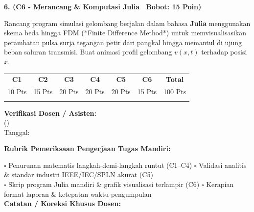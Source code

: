 \documentclass[10pt,a4paper]{article}
\begin{document}
\vspace{3.5mm}

\noindent\textbf{6. (C6 - Merancang \& Komputasi Julia \textbar\ Bobot: 15 Poin)}\par\vspace{0.8mm}
{\footnotesize Rancang program simulasi gelombang berjalan dalam bahasa \textbf{Julia} menggunakan skema beda hingga FDM (*Finite Difference Method*) untuk memvisualisasikan perambatan pulsa surja tegangan petir dari pangkal hingga memantul di ujung beban saluran transmisi. Buat animasi profil gelombang $v(x,t)$ terhadap posisi $x$.}\par

\vfill

\noindent\begin{minipage}[b]{0.62\textwidth}%
  \centering
  \scriptsize
  \begin{tabular}{|c|c|c|c|c|c|c|}
    \hline
    \rowcolor{unibblue}
    \textbf{\color{white}C1} & \textbf{\color{white}C2} & \textbf{\color{white}C3} & \textbf{\color{white}C4} & \textbf{\color{white}C5} & \textbf{\color{white}C6} & \textbf{\color{white}Total} \\
    \rowcolor{unibblue!10}
    10 Pts & 15 Pts & 20 Pts & 20 Pts & 20 Pts & 15 Pts & 100 Pts \\
    \hline
    & & & & & & \\[3mm]
    \hline
  \end{tabular}%
\end{minipage}%
\hfill%
\begin{minipage}[b]{0.35\textwidth}%
  \centering
  \scriptsize
  \textbf{Verifikasi Dosen / Asisten:}\\[6mm]
  (\dotfill)\\[1mm]
  \tiny Tanggal: \dotfill
\end{minipage}\par

\vspace{2mm}
\begin{tcolorbox}[colback=white,colframe=unibblue!40!black,colbacktitle=unibblue!10,coltitle=unibblue,boxrule=0.5pt,arc=2pt,left=5pt,right=5pt,top=3pt,bottom=3pt,title=\textbf{\tiny Catatan Evaluasi \& Umpan Balik Dosen Pengampu}]
  \tiny
  \textbf{Rubrik Pemeriksaan Pengerjaan Tugas Mandiri:}\par\vspace{0.8mm}
  $\square$ Penurunan matematis langkah-demi-langkah runtut (C1--C4) \hfill $\square$ Validasi analitis \& standar industri IEEE/IEC/SPLN akurat (C5)\\[0.8mm]
  $\square$ Skrip program Julia mandiri \& grafik visualisasi terlampir (C6) \hfill $\square$ Kerapian format laporan \& ketepatan waktu pengumpulan\\[2.0mm]
  \textbf{Catatan / Koreksi Khusus Dosen:}\\[1.6cm]
\end{tcolorbox}
\end{document}
